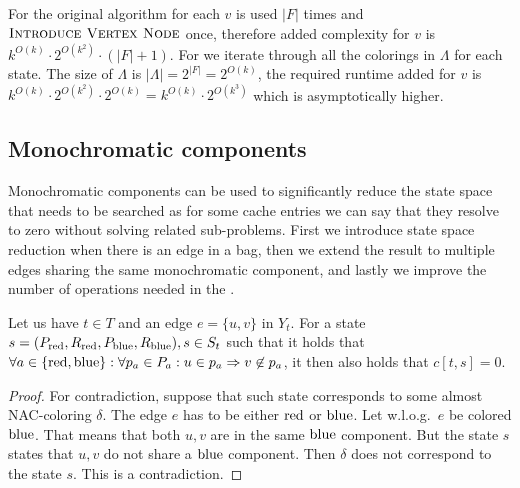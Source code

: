 For the original algorithm for each \( v \)
\IntroduceEdgeNode{} is used \( |F| \) times
and \( \textsc{Introduce Vertex Node}{} \) once, therefore added complexity for \( v \)
is \( {k}^{O(k)} \cdot 2^{O(k^2)} \cdot (|F| + 1) \).
%
For \IntroduceVertexWithEdgesNode{} we iterate
through all the colorings in \( \Lambda \) for each state.
The size of \( \Lambda \) is \( |\Lambda| = 2^{|F|} = 2^{O(k)} \),
the required runtime added for \( v \) is
\( {k}^{O(k)} \cdot 2^{O(k^2)} \cdot 2^{O(k)} = {k}^{O(k)} \cdot 2^{O(k^3)}\)
which is asymptotically higher.



\subsection{Monochromatic components}

Monochromatic components can be used to significantly reduce the state space
that needs to be searched as for some cache entries we can say that
they resolve to zero without solving related sub-problems.
%
First we introduce state space reduction when
there is an edge in a bag, then we extend the result to multiple edges
sharing the same monochromatic component, and lastly we improve the number of
operations needed in the \IntroduceVertexWithEdgesNode{}.
%
\begin{lemma}
	Let us have \( t \in T \) and an edge \( e = \{u, v\} \) in \( Y_t \).
	For a state \( s = (P_{\text{red}}, R_{\text{red}}, P_{\text{blue}}, R_{\text{blue}}), s \in S_t \)
	such that it holds that
	\( {\forall a \in \{\text{red}, \text{blue}\}} : {\forall p_a \in P_a} : {u \in p_a \Rightarrow v \not\in p_a} \),
	it then also holds that \( c[t, s] = 0 \).
\end{lemma}
%
%
\begin{proof}
	For contradiction, suppose that such state corresponds
	to some almost NAC-coloring \( \delta \).
	The edge \( e \) has to be either \( \text{red} \) or \( \text{blue} \).
	Let w.l.o.g.\ \( e \) be colored \( \text{blue} \).
	That means that both \( u, v \) are in the same \( \text{blue} \) component.
	But the state \( s \) states that \( u, v \) do not share a \( \text{blue} \) component.
	Then \( \delta \) does not correspond to the state \( s \).
	This is a contradiction.
\end{proof}
%

